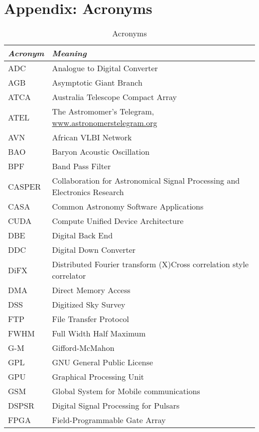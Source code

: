 \section{Appendix: Acronyms}
\label{sec:appendix}

\clearpage
\begin{table}
\caption{Acronyms}
\begin{tabular}{ll}
\emph{Acronym} & \emph{Meaning}\\
\hline
ADC & Analogue to Digital Converter\\
AGB & Asymptotic Giant Branch \\
ATCA & Australia Telescope Compact Array\\
ATEL & The Astromomer's Telegram, \url{www.astronomerstelegram.org}\\
AVN & African VLBI Network\\
BAO & Baryon Acoustic Oscillation\\
BPF & Band Pass Filter\\
CASPER & Collaboration for Astronomical Signal Processing and Electronics Research \\
CASA & Common Astronomy Software Applications \\
CUDA & Compute Unified Device Architecture\\
DBE & Digital Back End\\
DDC & Digital Down Converter \\
DiFX & Distributed Fourier transform (X)Cross correlation style correlator\\
DMA & Direct Memory Access\\
DSS & Digitized Sky Survey \\
FTP & File Transfer Protocol\\
FWHM & Full Width Half Maximum\\
G-M & Gifford-McMahon \\
GPL & GNU General Public License \\
GPU & Graphical Processing Unit\\
GSM & Global System for Mobile communications \\
DSPSR &  Digital Signal Processing for Pulsars \\
FPGA & Field-Programmable Gate Array \\

\end{tabular}
\end{table}
